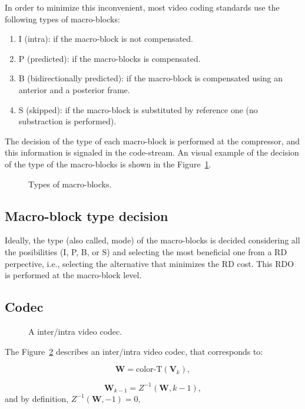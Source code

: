 In order to minimize this inconvenient, most video coding standards
use the following types of macro-blocks:
\begin{enumerate}
\item I (intra): if the macro-block is not compensated.
\item P (predicted): if the macro-blocks is compensated.
\item B (bidirectionally predicted): if the macro-block is compensated
  using an anterior and a posterior frame.
\item S (skipped): if the macro-block is substituted by reference one
  (no substraction is performed).
\end{enumerate}
The decision of the type of each macro-block is performed at the
compressor, and this information is signaled in the code-stream. An
visual example of the decision of the type of the macro-blocks is
shown in the Figure~\ref{fig:macroblocks}.

\begin{figure}
  \centering
  \caption{Types of macro-blocks.}
  \label{fig:macroblocks}
\end{figure}

\subsection{Macro-block type decision}
Ideally, the type (also called, mode) of the macro-blocks is decided
considering all the posibilities (I, P, B, or S) and selecting the
most beneficial one from a RD perpective, i.e., selecting the
alternative that minimizes the RD cost. This RDO is performed at the
macro-block level.

\subsection{Codec}
\begin{figure}
  \centering
  \caption{A inter/intra video codec.}
\label{fig:IPP_codec}
\end{figure}

The Figure~\ref{fig:IPP_codec} describes an inter/intra video codec,
that corresponds to:

\begin{equation}
  {\mathbf W} = \text{color-T}({\mathbf V}_k),
  \tag{a}
\end{equation}

\begin{equation}
   {\mathbf W}_{k-1} = Z^{-1}({\mathbf W}, k-1),
  \tag{b}
\end{equation}
and by definition, $Z^{-1}({\mathbf W}, -1) = 0$,

